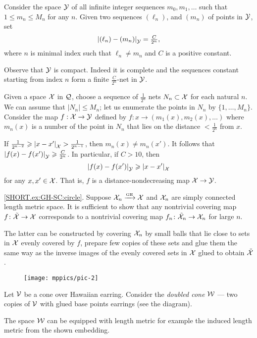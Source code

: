 Consider the space $\mathcal{Y}$ of all infinite integer sequences $m_0,m_1,\dots$ such that $1\le m_n\le M_n$ for any $n$.
Given two sequences $(\ell_n)$, and $(m_n)$ of points in $\mathcal{Y}$, set 
\[\dist{(\ell_n)}{(m_n)}{\spc{Y}}=\tfrac C{2^{n}},\]
where $n$ is minimal index such that $\ell_n\ne m_n$ and $C$ is a positive constant.

Observe that $\mathcal{Y}$ is compact.
Indeed it is complete and the sequences constant starting from index $n$ form a finite $\tfrac C{2^{n}}$-net in $\mathcal{Y}$.

Given a space $\mathcal{X}$ in $\mathcal{Q}$,
choose a sequence of $\tfrac1{2^n}$ nets 
$N_n\subset\mathcal{X}$ for each natural $n$.
We can assume that $|N_n|\le M_n$; let us enumerate the points in $N_n$ by $\{1,\dots,M_n\}$.
Consider the map $f:\mathcal{X}\to\mathcal{Y}$ defined by $f:x\to (m_1(x),m_2(x),\dots)$ where $m_n(x)$ is a number of the point in $N_n$ that lies on the distance $<\tfrac1{2^n}$ from $x$.

If $\tfrac1{2^{n-2}}\ge \dist{x}{x'}{\spc{X}}>\tfrac1{2^{n-1}}$, then $m_n(x)\ne m_n(x')$.
It follows that $\dist{f(x)}{f(x')}{\spc{Y}}\ge \tfrac C{2^{n}}$.
In particular, if $C>10$, then 
\[\dist{f(x)}{f(x')}{\spc{Y}}\ge \dist{x}{x'}{\spc{X}}\]
for any $x,x'\in \mathcal{X}$.
That is, $f$ is a distance-nondecreasing map $\mathcal{X}\to \mathcal{Y}$.

\parbf{\ref{ex:GH-SC},} \ref{SHORT.ex:GH-SC:circle}.
Suppose $\mathcal{X}_n\xrightarrow{\mbox{\tiny\rm GH}} \mathcal{X}$ and $\mathcal{X}_n$ are simply connected length metric space.
It is sufficient to show that any nontrivial covering map $f\colon\tilde{\mathcal{X}}\to \mathcal{X}$ corresponds to a nontrivial covering map $f_n\colon\tilde{\mathcal{X}}_n\to \mathcal{X}_n$ for large $n$.

The latter can be constructed by covering $\mathcal{X}_n$ by small balls that lie close to sets in $\mathcal{X}$ evenly covered by $f$, prepare few copies of these sets and glue them the same way as the inverse images of the evenly covered sets in $\mathcal{X}$ glued to obtain $\tilde{\mathcal{X}}$.

\begin{wrapfigure}{r}{40 mm}
\vskip-0mm
\centering
\texttt{[image: mppics/pic-2]}
\end{wrapfigure}

Let $\mathcal{V}$ be a cone over Hawaiian earring.
Consider the {}\emph{doubled cone} $\mathcal{W}$ --- two copies of $\mathcal{V}$ with glued base points earrings (see the diagram).

The space $\mathcal{W}$ can be equipped with length metric for example the induced length metric from the shown embedding.

